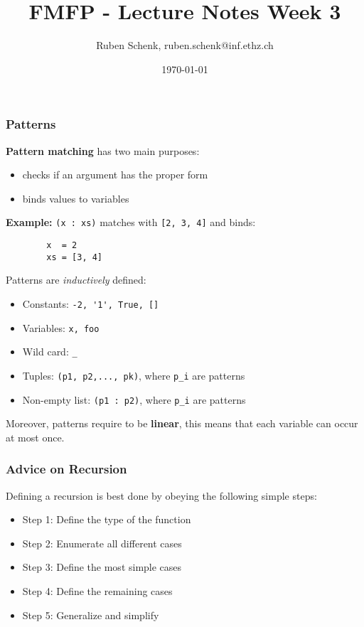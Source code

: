 \documentclass[a4paper]{extarticle}
\title{FMFP - Lecture Notes Week 3}
\author{Ruben Schenk, ruben.schenk@inf.ethz.ch}
\date{\today}
\begin{document}
\maketitle
\newpage

\subsubsection{Patterns}

\textbf{Pattern matching} has two main purposes:

\begin{itemize}
    \item checks if an argument has the proper form
    \item binds values to variables
\end{itemize}

\begin{ebox}
    \textbf{Example:} \verb|(x : xs)| matches with \verb|[2, 3, 4]| and binds:
    \begin{verbatim}
        x  = 2
        xs = [3, 4]
    \end{verbatim}
\end{ebox}

Patterns are \textit{inductively} defined:

\begin{itemize}
    \item Constants: \verb|-2, '1', True, []|
    \item Variables: \verb|x, foo|
    \item Wild card: \verb|_|
    \item Tuples: \verb|(p1, p2,..., pk)|, where \verb|p_i| are patterns
    \item Non-empty list: \verb|(p1 : p2)|, where \verb|p_i| are patterns
\end{itemize}

Moreover, patterns require to be \textbf{linear}, this means that each variable can occur at most once.

\subsubsection{Advice on Recursion}

Defining a recursion is best done by obeying the following simple steps:

\begin{itemize}
    \item Step 1: Define the type of the function
    \item Step 2: Enumerate all different cases
    \item Step 3: Define the most simple cases
    \item Step 4: Define the remaining cases
    \item Step 5: Generalize and simplify
\end{itemize}
\end{document}
